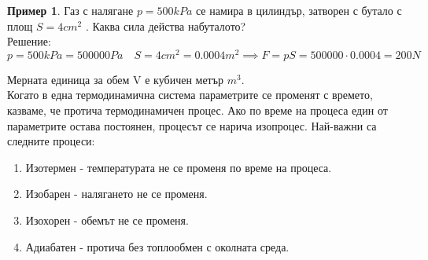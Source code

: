 \documentclass[fleqn, 12pt]{article}
\theoremstyle{definition}
\newtheorem{example}{Пример}[subsection]
\begin{document}
\begin{example}
Газ с налягане $p = 500 kPa$ се намира в цилиндър, затворен с бутало с площ
$S = 4 cm^2$ . Каква сила действа набуталото? \\
Решение: \\
$$p = 500kPa = 500 000 Pa \quad S = 4cm^2 = 0.0004 m^2 \implies F = pS = 500 000 \cdot 0.0004 = 200N$$
\end{example}
Мерната единица за обем V е кубичен метър $m^3$.\\
Когато в една термодинамична система параметрите се променят с времето,
казваме, че протича термодинамичен процес. Ако по време на процеса един от
параметрите остава постоянен, процесът се нарича изопроцес. Най-важни са следните
процеси:
\begin{enumerate}
\item Изотермен - температурата не се променя по време на процеса.
\item Изобарен - налягането не се променя.
\item Изохорен - обемът не се променя.
\item Адиабатен - протича без топлообмен с околната среда.
\end{enumerate}
\end{document}

